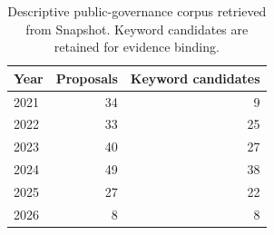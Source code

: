 \begin{table}[t]
\centering\small
\caption{Descriptive public-governance corpus retrieved from Snapshot. Keyword candidates are retained for evidence binding.}
\label{tab:public-corpus}
\begin{tabular}{@{}lrr@{}}\toprule
Year & Proposals & Keyword candidates \\ \midrule
2021 & 34 & 9 \\
2022 & 33 & 25 \\
2023 & 40 & 27 \\
2024 & 49 & 38 \\
2025 & 27 & 22 \\
2026 & 8 & 8 \\
\bottomrule
\end{tabular}
\end{table}
